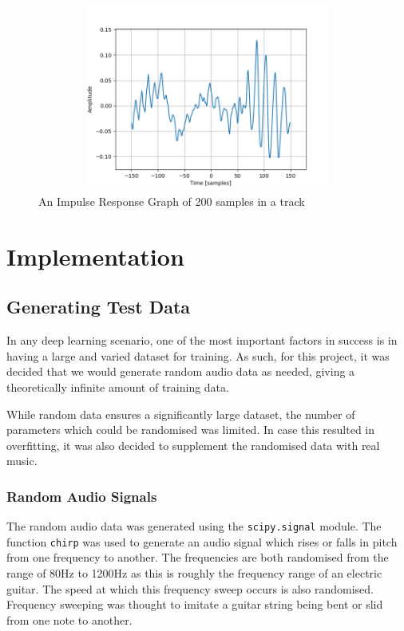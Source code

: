 \documentclass{l4proj}
\begin{document}
\begin{figure}
\centering
\includegraphics[width=6in,height=2.4in]{images/impulse.png}
\caption{An Impulse Response Graph of 200 samples in a
track\label{fig:impulse}}
\end{figure}

\hypertarget{implementation}{%
\chapter{Implementation}\label{implementation}}

\hypertarget{generating-test-data}{%
\section{Generating Test Data}\label{generating-test-data}}

In any deep learning scenario, one of the most important factors in
success is in having a large and varied dataset for training. As such,
for this project, it was decided that we would generate random audio
data as needed, giving a theoretically infinite amount of training data.

While random data ensures a significantly large dataset, the number of
parameters which could be randomised was limited. In case this resulted
in overfitting, it was also decided to supplement the randomised data
with real music.

\hypertarget{random-audio-signals}{%
\subsection{Random Audio Signals}\label{random-audio-signals}}

The random audio data was generated using the \texttt{scipy.signal}
module. The function \texttt{chirp} was used to generate an audio signal
which rises or falls in pitch from one frequency to another. The
frequencies are both randomised from the range of 80Hz to 1200Hz as this
is roughly the frequency range of an electric guitar. The speed at which
this frequency sweep occurs is also randomised. Frequency sweeping was
thought to imitate a guitar string being bent or slid from one note to
another.
\end{document}
